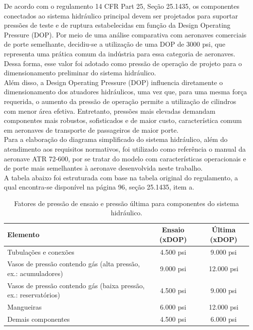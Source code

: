 De acordo com o regulamento 14 CFR Part 25, Seção 25.1435, os componentes conectados ao sistema hidráulico principal devem ser projetados para suportar pressões de teste e de ruptura estabelecidas em função da Design Operating Pressure (DOP). Por meio de uma análise comparativa com aeronaves comerciais de porte semelhante, decidiu-se a utilização de uma DOP de 3000 psi, que representa uma prática comum da indústria para essa categoria de aeronaves. Dessa forma, esse valor foi adotado como pressão de operação de projeto para o dimensionamento preliminar do sistema hidráulico.\\
Além disso, a Design Operating Pressure (DOP) influencia diretamente o dimensionamento dos atuadores hidráulicos, uma vez que, para uma mesma força requerida, o aumento da pressão de operação permite a utilização de cilindros com menor área efetiva. Entretanto, pressões mais elevadas demandam componentes mais robustos, sofisticados e de maior custo, característica comum em aeronaves de transporte de passageiros de maior porte.\\
Para a elaboração do diagrama simplificado do sistema hidráulico, além do atendimento aos requisitos normativos, foi utilizado como referência o manual da aeronave ATR 72-600, por se tratar do modelo com características operacionais e de porte mais semelhantes à aeronave desenvolvida neste trabalho.\\
 A tabela abaixo foi estruturada com base na tabela original do regulamento, a qual encontra-se disponível na página 96, seção 25.1435, item a.
\begin{table}[H]
\centering
\caption{Fatores de pressão de ensaio e pressão última para componentes do sistema hidráulico.}
\label{tab:pressao_hidraulica}

\begin{tabular}{|p{8cm}|c|c|}
\hline
\textbf{Elemento} & \textbf{Ensaio (xDOP)} & \textbf{Última (xDOP)} \\
\hline
Tubulações e conexões & 4.500 psi & 9.000 psi\\
\hline
Vasos de pressão contendo gás (alta pressão, ex.: acumuladores) & 9.000 psi& 12.000 psi\\
\hline
Vasos de pressão contendo gás (baixa pressão, ex.: reservatórios) & 4.500 psi & 9.000 psi \\
\hline
Mangueiras & 6.000 psi & 12.000 psi \\
\hline
Demais componentes & 4.500 psi& 6.000 psi \\
\hline
\end{tabular}
\end{table}

